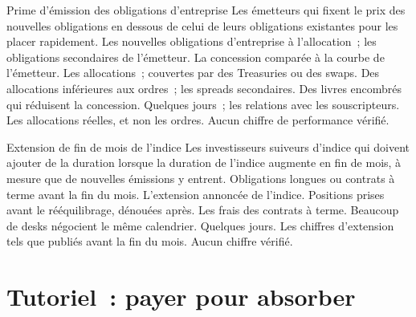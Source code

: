 \begin{strategyfile}{Prime d'émission des obligations d'entreprise}\label{strat:s2:supply-trades:corporate}
 Les émetteurs qui fixent le prix des nouvelles obligations en dessous de celui de leurs obligations existantes pour les placer rapidement.
 Les nouvelles obligations d'entreprise à l'allocation~; les obligations secondaires de l'émetteur.
 La concession comparée à la courbe de l'émetteur.
 Les allocations~; couvertes par des Treasuries ou des swaps.
 Des allocations inférieures aux ordres~; les spreads secondaires.
 Des livres encombrés qui réduisent la concession.
 Quelques jours~; les relations avec les souscripteurs.
 Les allocations réelles, et non les ordres.
 Aucun chiffre de performance vérifié.
\end{strategyfile}

\begin{strategyfile}{Extension de fin de mois de l'indice}\label{strat:s2:supply-trades:extension}
 Les investisseurs suiveurs d'indice qui doivent ajouter de la duration lorsque la duration de l'indice augmente en fin de mois, à mesure que de nouvelles émissions y entrent.
 Obligations longues ou contrats à terme avant la fin du mois.
 L'extension annoncée de l'indice.
 Positions prises avant le rééquilibrage, dénouées après.
 Les frais des contrats à terme.
 Beaucoup de desks négocient le même calendrier.
 Quelques jours.
 Les chiffres d'extension tels que publiés avant la fin du mois.
 Aucun chiffre vérifié.
\end{strategyfile}

\section{Tutoriel~: payer pour absorber}\label{tut:s2:supply-trades:tut}

